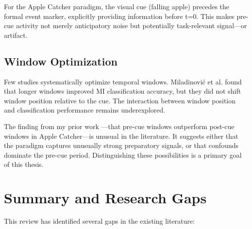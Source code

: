 For the Apple Catcher paradigm, the visual cue (falling apple) precedes the formal event marker, explicitly providing information before t=0. This makes pre-cue activity not merely anticipatory noise but potentially task-relevant signal—or artifact.


\subsection{Window Optimization}
\label{subsec:rw_window_optimization}

Few studies systematically optimize temporal windows. Miladinović et al. \cite{miladinovic2024optimizing} found that longer windows improved MI classification accuracy, but they did not shift window position relative to the cue. The interaction between window position and classification performance remains underexplored.

The finding from my prior work \cite{fritzner2025specialization}—that pre-cue windows outperform post-cue windows in Apple Catcher—is unusual in the literature. It suggests either that the paradigm captures unusually strong preparatory signals, or that confounds dominate the pre-cue period. Distinguishing these possibilities is a primary goal of this thesis.


\section{Summary and Research Gaps}
\label{sec:rw_summary}

This review has identified several gaps in the existing literature:

